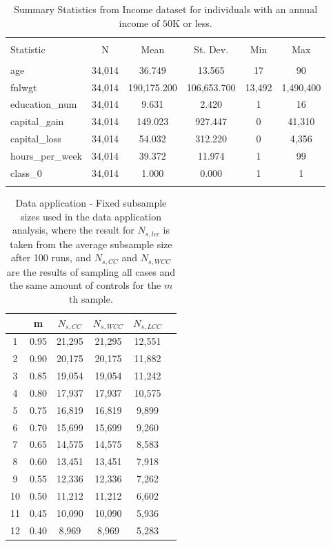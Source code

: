 \begin{table}[H] \centering 
\begin{tabular}{@{\extracolsep{5pt}}lccccc} 
\\[-1.8ex]\hline 
\hline \\[-1.8ex] 
Statistic & \multicolumn{1}{c}{N} & \multicolumn{1}{c}{Mean} & \multicolumn{1}{c}{St. Dev.} & \multicolumn{1}{c}{Min} & \multicolumn{1}{c}{Max} \\ 
\hline \\[-1.8ex] 
age & 34,014 & 36.749 & 13.565 & 17 & 90 \\ 
fnlwgt & 34,014 & 190,175.200 & 106,653.700 & 13,492 & 1,490,400 \\ 
education\_num & 34,014 & 9.631 & 2.420 & 1 & 16 \\ 
capital\_gain & 34,014 & 149.023 & 927.447 & 0 & 41,310 \\ 
capital\_loss & 34,014 & 54.032 & 312.220 & 0 & 4,356 \\ 
hours\_per\_week & 34,014 & 39.372 & 11.974 & 1 & 99 \\ 
class\_0 & 34,014 & 1.000 & 0.000 & 1 & 1 \\ 
\hline \\[-1.8ex] 
\end{tabular} 
\caption[Data application - Summary statistics for individuals with an annual income of $50$K or less.]{Summary Statistics from Income dataset for individuals with an annual income of $50$K or less.} 
\label{tab:data-summary3} 
\end{table} 

\begin{table}[H]
\centering
\begin{tabular}{cccccc}
\hline
& m & $N_{s,CC}$ & $N_{s,WCC}$ & $N_{s,LCC}$\\ 
\hline
1 & 0.95 & 21,295 & 21,295 & 12,551 \\ 
2 & 0.90 & 20,175 & 20,175 & 11,882 \\ 
3 & 0.85 & 19,054 & 19,054 & 11,242 \\ 
4 & 0.80 & 17,937 & 17,937 & 10,575 \\ 
5 & 0.75 & 16,819 & 16,819 & 9,899 \\ 
6 & 0.70 & 15,699 & 15,699 & 9,260 \\ 
7 & 0.65 & 14,575 & 14,575 & 8,583 \\ 
8 & 0.60 & 13,451 & 13,451 & 7,918 \\ 
9 & 0.55 & 12,336 & 12,336 & 7,262 \\ 
10 & 0.50 & 11,212 & 11,212 & 6,602 \\ 
11 & 0.45 & 10,090 & 10,090 & 5,936 \\ 
12 & 0.40 & 8,969 & 8,969 & 5,283 \\ 
\hline
\end{tabular}
\caption[Data application - Fixed subsample sizes]{Data application - Fixed subsample sizes used in the data application analysis, where the result for $N_{s,lcc}$ is taken from the average subsample size after 100 runs, and $N_{s,CC}$ and $N_{s,WCC}$ are the results of sampling all cases and the same amount of controls for the $m$th sample.} 
\label{tab:data-fixedNs} 
\end{table}